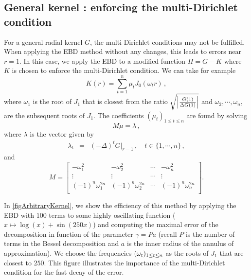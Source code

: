 \documentclass[smallextended]{svjour3}
\begin{document}
\subsection{General kernel : enforcing the multi-Dirichlet condition}
\label{begal1}
For a general radial kernel $G$, the multi-Dirichlet conditions may not be fulfilled. When applying the EBD method without any changes, this leads to errors near $r=1$. In this case, we apply the EBD to a modified function $H = G - K$ where $K$ is chosen to enforce the multi-Dirichlet condition. We can take for example
\[K(r) = \sum_{t=1}^{n} \mu_t J_0(\omega_t r)\,,\]
where $\omega_1$ is the root of $J_1$ that is closest from the ratio $\sqrt{\left\lvert \frac{G(1)}{\Delta G(1)} \right\rvert}$ and $\omega_2, \cdots, \omega_n$, are the subsequent roots of $J_1$. The coefficients $(\mu_t)_{1 \leq t \leq n}$ are found by solving
\[M\mu = \lambda\,,\]
where $\lambda$ is the vector given by
\begin{eqnarray*}
	\lambda_t &=& (-\Delta)^t G \big|_{r=1}\,, \quad t\in \{1,\cdots,n\}\,,
\end{eqnarray*}
and
\[M=
	\begin{bmatrix}
		-\omega_1^2          & -\omega_2^2          & \cdots & -\omega_n^2          \\
		\vdots               & \vdots               & \cdots & \vdots               \\
		(-1)^n \omega_1^{2n} & (-1)^n \omega_2^{2n} & \cdots & (-1)^n \omega_n^{2n} \\ 
	\end{bmatrix}.
\]
\vspace{5pt}
			
In \autoref{figArbitraryKernel}, we show the efficiency of this method by applying the EBD with $100$ terms to some highly oscillating function ($x \mapsto \log(x) + \sin(250x)$) and computing the maximal error of the decomposition in function of the parameter $\gamma = Pa$ (recall $P$ is the number of terms in the Bessel decomposition and $a$ is the inner radius of the annulus of approximation). We choose the frequencies $(\omega_{t})_{1 \leq t \leq n}$ as the roots of $J_1$ that are closest to $250$. This figure illustrates the importance of the multi-Dirichlet condition for the fast decay of the error. 
													
\end{document}
